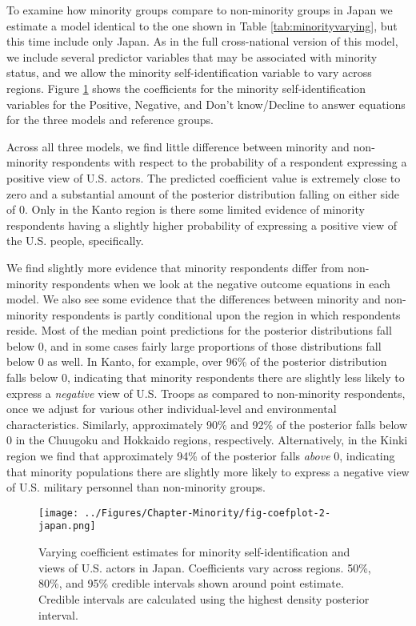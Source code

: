 To examine how minority groups compare to non-minority groups in Japan we estimate a model identical to the one shown in Table \ref{tab:minorityvarying}, but this time include only Japan. As in the full cross-national version of this model, we include several predictor variables that may be associated with minority status, and we allow the minority self-identification variable to vary across regions. Figure \ref{fig:coefplot-japan} shows the coefficients for the minority self-identification variables for the Positive, Negative, and Don't know/Decline to answer equations for the three models and reference groups.

Across all three models, we find little difference between minority and non-minority respondents with respect to the probability of a respondent expressing a positive view of U.S. actors. The predicted coefficient value is extremely close to zero and a substantial amount of the posterior distribution falling on either side of 0. Only in the Kanto region is there some limited evidence of minority respondents having a slightly higher probability of expressing a positive view of the U.S. people, specifically. 

We find slightly more evidence that minority respondents differ from non-minority respondents when we look at the negative outcome equations in each model. We also see some evidence that the differences between minority and non-minority respondents is partly conditional upon the region in which respondents reside. Most of the median point predictions for the posterior distributions fall below 0, and in some cases fairly large proportions of those distributions fall below 0 as well. In Kanto, for example, over 96\% of the posterior distribution falls below 0, indicating that minority respondents there are slightly less likely to express a \textit{negative} view of U.S. Troops as compared to non-minority respondents, once we adjust for various other individual-level and environmental characteristics. Similarly, approximately 90\% and 92\% of the posterior falls below 0 in the Chuugoku and Hokkaido regions, respectively. Alternatively, in the Kinki region we find that approximately 94\% of the posterior falls \textit{above} 0, indicating that minority populations there are slightly more likely to express a negative view of U.S. military personnel than non-minority groups.


\begin{figure}[t]
	\centering\texttt{[image: ../Figures/Chapter-Minority/fig-coefplot-2-japan.png]}
	\caption{Varying coefficient estimates for minority self-identification and views of U.S. actors in Japan. Coefficients vary across regions. 50\%, 80\%, and 95\% credible intervals shown around point estimate. Credible intervals are calculated using the highest density posterior interval.}
	\label{fig:coefplot-japan}
\end{figure}

